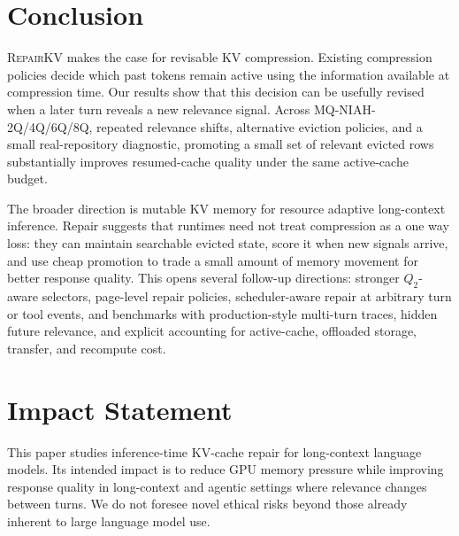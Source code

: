 \documentclass{article}
\newcommand{\repairkv}{\textsc{RepairKV}}
\begin{document}
{\section{Conclusion}
\label{sec:conclusion}
\repairkv{} makes the case for revisable KV compression. Existing compression policies decide which past tokens remain active using the information available at compression time. Our results show that this decision can be usefully revised when a later turn reveals a new relevance signal. Across MQ-NIAH-2Q/4Q/6Q/8Q, repeated relevance shifts, alternative eviction policies, and a small real-repository diagnostic, promoting a small set of relevant evicted rows substantially improves resumed-cache quality under the same active-cache budget.

The broader direction is mutable KV memory for resource adaptive long-context inference. Repair suggests that runtimes need not treat compression as a one way loss: they can maintain searchable evicted state, score it when new signals arrive, and use cheap promotion to trade a small amount of memory movement for better response quality. This opens several follow-up directions: stronger $Q_2$-aware selectors, page-level repair policies, scheduler-aware repair at arbitrary turn or tool events, and benchmarks with production-style multi-turn traces, hidden future relevance, and explicit accounting for active-cache, offloaded storage, transfer, and recompute cost.

\section*{Impact Statement}
This paper studies inference-time KV-cache repair for long-context language models. Its intended impact is to reduce GPU memory pressure while improving response quality in long-context and agentic settings where relevance changes between turns. We do not foresee novel ethical risks beyond those already inherent to large language model use.}
\end{document}
